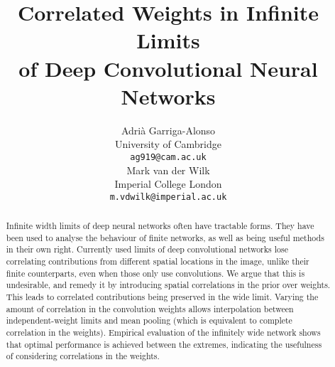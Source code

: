 \documentclass{article}
\title{Correlated Weights in Infinite Limits \\ of Deep Convolutional Neural Networks}
\author{%
  Adrià Garriga-Alonso \\
  University of Cambridge \\
  \texttt{ag919@cam.ac.uk} \\
   \And
   Mark van der Wilk \\
   Imperial College London \\
   \texttt{m.vdwilk@imperial.ac.uk} \\
}
\theoremstyle{definition}
\begin{document}
\maketitle

\begin{abstract}
Infinite width limits of deep neural networks often have tractable forms. They have been used to analyse the behaviour of finite networks, as well as being useful methods in their own right. Currently used limits of deep convolutional networks lose correlating contributions from different spatial locations in the image, unlike their finite counterparts, even when those only use convolutions. We argue that this is undesirable, and remedy it by introducing spatial correlations in the prior over weights. This leads to correlated contributions being preserved in the wide limit. Varying the amount of correlation in the convolution weights allows interpolation between independent-weight limits and mean pooling (which is equivalent to complete correlation in the weights). Empirical evaluation of the infinitely wide network shows that optimal performance is achieved between the extremes, indicating the usefulness of considering correlations in the weights.
\end{abstract}

\end{document}
